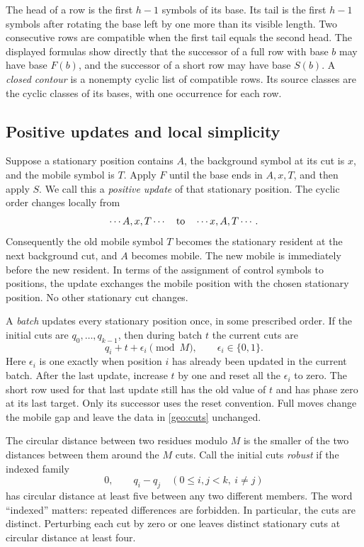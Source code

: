 The head of a row is the first $h-1$ symbols of its base. Its tail is the
first $h-1$ symbols after rotating the base left by one more than its
visible length. Two consecutive rows are compatible when the first tail
equals the second head. The displayed formulas show directly that the
successor of a full row with base $b$ may have base $F(b)$, and the
successor of a short row may have base $S(b)$. A \emph{closed contour} is a
nonempty cyclic list of compatible rows. Its source classes are the cyclic
classes of its bases, with one occurrence for each row.

\subsection{Positive updates and local simplicity}

Suppose a stationary position contains $A$, the background symbol at its
cut is $x$, and the mobile symbol is $T$. Apply $F$ until the base ends in
$A,x,T$, and then apply $S$. We call this a \emph{positive update} of that
stationary position. The cyclic order changes locally from
\[
 \cdots A,x,T\cdots
 \quad\hbox{to}\quad
 \cdots x,A,T\cdots.
\]
Consequently the old mobile symbol $T$ becomes the stationary resident at
the next background cut, and $A$ becomes mobile. The new mobile is
immediately before the new resident. In terms of the assignment of control
symbols to positions, the update exchanges the mobile position with the
chosen stationary position. No other stationary cut changes.

A \emph{batch} updates every stationary position once, in some prescribed
order. If the initial cuts are $q_0,\ldots,q_{k-1}$, then during batch $t$
the current cuts are
\begin{equation}
 q_i+t+\epsilon_i\pmod M,
 \qquad \epsilon_i\in\{0,1\}.
 \label{geo:cuts}
\end{equation}
Here $\epsilon_i$ is one exactly when position $i$ has already been
updated in the current batch. After the last update, increase $t$ by one
and reset all the $\epsilon_i$ to zero. The short row used for that last
update still has the old value of $t$ and has phase zero at its last
target. Only its successor uses the reset convention. Full moves change
the mobile gap and leave the data in \eqref{geo:cuts} unchanged.

The circular distance between two residues modulo $M$ is the smaller of
the two distances between them around the $M$ cuts. Call the initial cuts
\emph{robust} if the indexed family
\[
 0,\qquad q_i-q_j\quad(0\leq i,j<k,\ i\ne j)
\]
has circular distance at least five between any two different members.
The word ``indexed'' matters: repeated differences are forbidden. In
particular, the cuts are distinct. Perturbing each cut by zero or one
leaves distinct stationary cuts at circular distance at least four.

